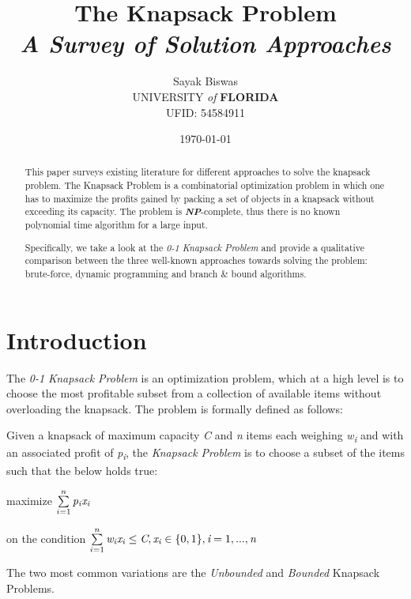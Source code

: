 \documentclass{article}
\title{The Knapsack Problem \\ \small \textit{A Survey of Solution Approaches}}
\date{\small \today}
\author{Sayak Biswas \\ \small UNIVERSITY \textit{of} \textbf{FLORIDA} \\ \small UFID: 54584911}
\begin{document}
\maketitle
\begin{abstract}
This paper surveys existing literature for different approaches to solve the knapsack problem. The Knapsack Problem is a combinatorial optimization problem in which one has to maximize the profits gained by packing a set of objects in a knapsack without exceeding its capacity. The problem is \textbf{\textit{NP}}-complete, thus there is no known polynomial time algorithm for a large input.

Specifically, we take a look at the \textit{0-1 Knapsack Problem} and provide a qualitative comparison between the three well-known approaches towards solving the problem: brute-force, dynamic programming and branch \& bound algorithms.
\end{abstract}
\newpage

\section{Introduction}
The \textit{0-1 Knapsack Problem} is an optimization problem, which at a high level is to choose the most profitable subset from a collection of available items without overloading the knapsack. The problem is formally defined as follows:

Given a knapsack of maximum capacity \textit{C} and \textit{n} items each weighing \textit{w\textsubscript{i}} and with an associated profit of \textit{p\textsubscript{i}}, the \textit{Knapsack Problem} is to choose a subset of the items such that the below holds true:

maximize $\sum\limits_{i=1}^{n}\textit{p\textsubscript{i}x\textsubscript{i}}$

on the condition $\sum\limits_{i=1}^{n}\textit{w\textsubscript{i}x\textsubscript{i}} \leq \textit{C}, \textit{x\textsubscript{i}} \in \{0, 1\}, \textit{i} = 1,...,\textit{n}$

The two most common variations are the \textit{Unbounded} and \textit{Bounded} Knapsack Problems. 

\end{document}
